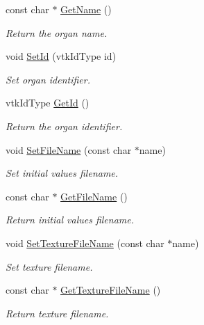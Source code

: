 \begin{DoxyCompactItemize}
const char $\ast$ \hyperlink{classvtkOrgan_a8421389b02b00b42b0899b75d00633b4}{GetName} ()
\begin{DoxyCompactList}\small\item\em Return the organ name. \item\end{DoxyCompactList}\item 
void \hyperlink{classvtkOrgan_a0aab831b4e0a9d33ba961a0907b73e80}{SetId} (vtkIdType id)
\begin{DoxyCompactList}\small\item\em Set organ identifier. \item\end{DoxyCompactList}\item 
vtkIdType \hyperlink{classvtkOrgan_a8e45f79da9c4e7029492ced2f55c25ed}{GetId} ()
\begin{DoxyCompactList}\small\item\em Return the organ identifier. \item\end{DoxyCompactList}\item 
void \hyperlink{classvtkOrgan_a9fad20fc19aadd62505ed6a39e482d23}{SetFileName} (const char $\ast$name)
\begin{DoxyCompactList}\small\item\em Set initial values filename. \item\end{DoxyCompactList}\item 
const char $\ast$ \hyperlink{classvtkOrgan_a83331bddcf2a07b54a5df5e6e23b130f}{GetFileName} ()
\begin{DoxyCompactList}\small\item\em Return initial values filename. \item\end{DoxyCompactList}\item 
void \hyperlink{classvtkOrgan_af19a32e071ae5f9c9848b2ad7088d0c1}{SetTextureFileName} (const char $\ast$name)
\begin{DoxyCompactList}\small\item\em Set texture filename. \item\end{DoxyCompactList}\item 
const char $\ast$ \hyperlink{classvtkOrgan_aaec0735181654c6500d0767eed30b94d}{GetTextureFileName} ()
\begin{DoxyCompactList}\small\item\em Return texture filename. \item\end{DoxyCompactList}\item 

\end{DoxyCompactItemize}
